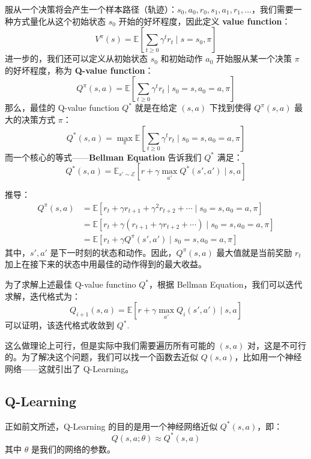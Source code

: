 服从一个决策将会产生一个样本路径（轨迹）：$s_0,a_0,r_0,s_1,a_1,r_1,\ldots$，我们需要一种方式量化从这个初始状态 $s_0$ 开始的好坏程度，因此定义 \textbf{value function}：
\[
V^{\pi}(s)=\mathbb E\left[\sum_{t\geqslant 0}\gamma ^tr_t\mid s=s_0,\pi\right]
\]
进一步的，我们还可以定义从初始状态 $s_0$ 和初始动作 $a_0$ 开始服从某一个决策 $\pi$ 的好坏程度，称为 \textbf{Q-value function}：
\[
Q^{\pi}(s,a)=\mathbb E\left[\sum_{t\geqslant 0}\gamma^tr_t\mid s_0=s,a_0=a,\pi\right]
\]
那么，最佳的 Q-value function $Q^*$ 就是在给定 $(s,a)$ 下找到使得 $Q^{\pi}(s,a)$ 最大的决策方式 $\pi$：
\[
Q^*(s,a)=\max_\pi\mathbb E\left[\sum_{t\geqslant 0}\gamma^tr_t\mid s_0=s,a_0=a,\pi\right]
\]
而一个核心的等式——\textbf{Bellman Equation} 告诉我们 $Q^*$ 满足：
\[
Q^*(s,a)=\mathbb E_{s'\sim \mathcal E}\left[r+\gamma\max_{a'}Q^*(s',a')\mid s,a\right]
\]

\begin{com}
    推导：
    \begin{align*}
    Q^\pi(s,a)&=\mathbb E\left[r_{t}+\gamma r_{t+1}+\gamma^2r_{t+2}+\cdots\mid s_0=s,a_0=a,\pi\right]\\
    &=\mathbb E[r_t+\gamma(r_{t+1}+\gamma r_{t+2}+\cdots)\mid s_0=s,a_0=a,\pi]\\
    &=\mathbb E[r_t+\gamma Q^{\pi}(s',a')\mid s_0=s,a_0=a,\pi]
    \end{align*}
    其中，$s',a'$ 是下一时刻的状态和动作。因此，$Q^\pi(s,a)$ 最大值就是当前奖励 $r_t$ 加上在接下来的状态中用最佳的动作得到的最大收益。
\end{com}

为了求解上述最佳 Q-value functino $Q^*$，根据 Bellman Equation，我们可以迭代求解，迭代格式为：
\[
Q_{i+1}(s, a)=\mathbb E\left[r+\gamma \max_{a'}Q_i(s',a')\mid s,a\right]
\]
可以证明，该迭代格式收敛到 $Q^*$.

这么做理论上可行，但是实际中我们需要遍历所有可能的 $(s,a)$ 对，这是不可行的。为了解决这个问题，我们可以找一个函数去近似 $Q(s,a)$，比如用一个神经网络——这就引出了 Q-Learning。

\subsection{Q-Learning}

正如前文所述，Q-Learning 的目的是用一个神经网络近似 $Q^*(s,a)$，即：
\[
Q(s,a;\theta)\approx Q^*(s,a)
\]
其中 $\theta$ 是我们的网络的参数。

